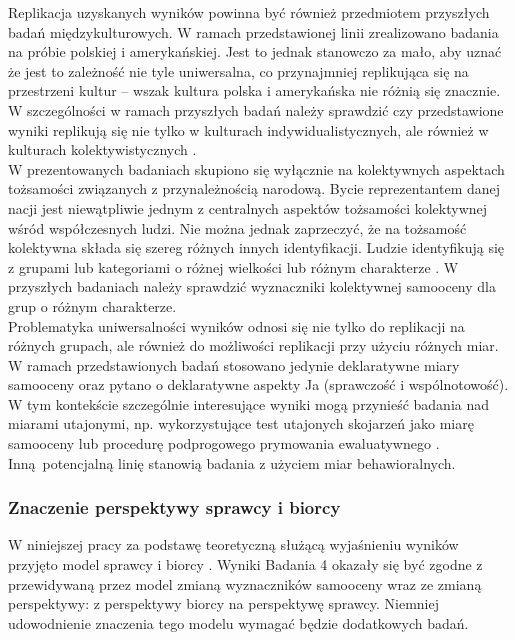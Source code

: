 \documentclass[man]{apa6}
\begin{document}
Replikacja uzyskanych wyników powinna być również przedmiotem przyszłych badań międzykulturowych. W ramach przedstawionej linii zrealizowano badania na próbie polskiej i amerykańskiej. Jest to jednak stanowczo za mało, aby uznać że jest to zależność nie tyle uniwersalna, co przynajmniej replikująca się na przestrzeni kultur -- wszak kultura polska i amerykańska nie różnią się znacznie. W szczególności w ramach przyszłych badań należy sprawdzić czy przedstawione wyniki replikują się nie tylko w kulturach indywidualistycznych, ale również w kulturach kolektywistycznych \parencite[patrz np.,][]{markus1991culture}. \\

W prezentowanych badaniach skupiono się wyłącznie na kolektywnych aspektach tożsamości związanych z przynależnością narodową. Bycie reprezentantem danej nacji jest niewątpliwie jednym z centralnych aspektów tożsamości kolektywnej wśród współczesnych ludzi. Nie można jednak zaprzeczyć, że na tożsamość kolektywna składa się szereg różnych innych identyfikacji. Ludzie identyfikują się z grupami lub kategoriami o różnej wielkości lub różnym charakterze \parencite[patrz np.,][]{lickel2000varieties}. W przyszłych badaniach należy sprawdzić wyznaczniki kolektywnej samooceny dla grup o różnym charakterze.\\

Problematyka uniwersalności wyników odnosi się nie tylko do replikacji na różnych grupach, ale również do możliwości replikacji przy użyciu różnych miar. W ramach przedstawionych badań stosowano jedynie deklaratywne miary samooceny oraz pytano o deklaratywne aspekty Ja (sprawczość i wspólnotowość). W tym kontekście szczególnie interesujące wyniki mogą przynieść badania nad miarami utajonymi, np. wykorzystujące test utajonych skojarzeń jako miarę samooceny \parencite{greenwald2000using} lub procedurę podprogowego prymowania ewaluatywnego \parencite{dijksterhuis2004like}. Inną potencjalną linię stanowią badania z użyciem miar behawioralnych.\\

\subsubsection{Znaczenie perspektywy sprawcy i biorcy}

W niniejszej pracy za podstawę teoretyczną służącą wyjaśnieniu wyników przyjęto model sprawcy i biorcy \parencite{abele2014communal}. Wyniki Badania 4 okazały się być zgodne z przewidywaną przez model zmianą wyznaczników samooceny wraz ze zmianą perspektywy: z perspektywy biorcy na perspektywę sprawcy. Niemniej udowodnienie znaczenia tego modelu wymagać będzie dodatkowych badań.\\
\end{document}
